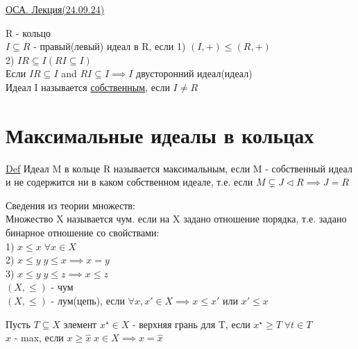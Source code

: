 \documentclass[a4paper]{article}
\begin{document}
\begin{center}
    \underline{ОСА. Лекция(24.09.24)}
\end{center}

R - кольцо \\
$ I \subseteq R $ - правый(левый) идеал в R, если
1) $ (I, +) \leq (R, +) $ \\
2) $ IR \subseteq I (RI \subseteq I) $ \\
Если  $ IR \subseteq I $ and $ RI \subseteq I \implies I $ двусторонний идеал(идеал)\\

Идеал I называется \underline{собственным}, если $ I \neq R $ 

\section*{\centering Максимальные идеалы в кольцах}

\underline{Def} Идеал M в кольце R называется максимальным, если M - собственный
идеал и не содержится ни в каком собственном идеале, т.е. если $ M \subsetneq J \lhd R
\implies J = R$ 

Сведения из теории множеств:\\
Множество X называется чум. если на X задано отношение порядка, т.е. 
задано бинарное отношение со свойствами:\\
1) $ x \leq x \; \forall x \in X $ \\
2) $ x \leq y \; y \leq x \implies x=y $ \\
3) $ x \leq y \; y \leq z \implies x \leq z $\\
$ (X, \leq) $ - чум\\

$ (X, \leq) $ - лум(цепь), если $ \forall x, x' \in X \implies x \leq x' \text{ или }
x' \leq x$ 

Пусть $ T \subseteq X $ элемент $ x^{\star} \in X $ - верхняя грань для T, если
$ x^{\star} \geq T \; \forall t \in T $ \\

$ \hat{x} $ - max, если $ x \geq \hat{x}\; x \in X \implies x = \hat{x} $ \\
\end{document}
